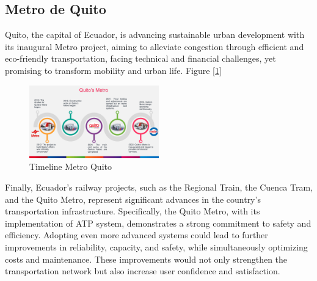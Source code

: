 \documentclass[conference]{IEEEtran}
\begin{document}
\subsection{Metro de Quito}

Quito, the capital of Ecuador, is advancing sustainable urban development with its inaugural Metro project, aiming to alleviate congestion through efficient and eco-friendly transportation, facing technical and financial challenges, yet promising to transform mobility and urban life. Figure [\ref{Timeline Metro Quito}]

\begin{figure}[ht]                                     
    \centerline{\includegraphics[width=0.5\textwidth, scale=0.50]{Imagenes_general/Metro de Quito_en.pdf}}
    \caption{Timeline Metro Quito}                     
    \label{Timeline Metro Quito}                                                 
\end{figure} 

Finally, Ecuador's railway projects, such as the Regional Train, the Cuenca Tram, and the Quito Metro, represent significant advances in the country's transportation infrastructure. Specifically, the Quito Metro, with its implementation of ATP system, demonstrates a strong commitment to safety and efficiency. Adopting even more advanced systems could lead to further improvements in reliability, capacity, and safety, while simultaneously optimizing costs and maintenance. These improvements would not only strengthen the transportation network but also increase user confidence and satisfaction.

\end{document}
